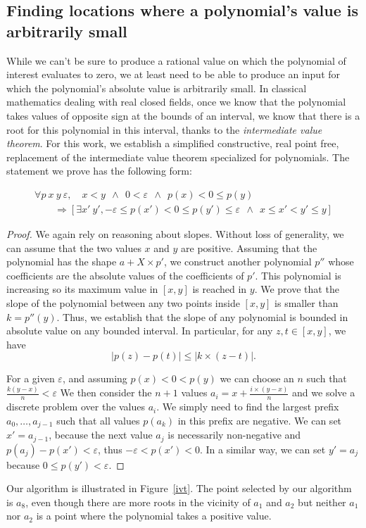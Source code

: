 \documentclass{mscs}
\begin{document}
\subsection{Finding locations where a polynomial's value is
  arbitrarily small}
\label{ssec:civt}
While we can't be sure to produce a rational value on which the
polynomial of interest evaluates to zero, we at least need to be
able to produce an input for which the polynomial's absolute value is
arbitrarily small. In classical mathematics dealing with real closed
fields, once we know that the
polynomial takes values of opposite sign at the bounds of an interval,
we know that there is a root for this polynomial in this interval,
thanks to the {\em intermediate value theorem}. For this work, we establish
a simplified constructive, real point free, replacement of the intermediate value
theorem specialized for polynomials.  The statement we prove has the following
form:
\begin{theorem}
\[
\begin{array}{l}
{\forall p~x~y~\varepsilon,\quad x < y~~\wedge~~0 < \varepsilon~~\wedge~~p(x) < 0 \leq p(y)}\\
\qquad\Rightarrow [\exists x'~ y', -\varepsilon \leq p(x') < 0 \leq p(y') \leq
\varepsilon ~~\wedge~~
x \leq x' < y' \leq y]
\end{array}
\]
\end{theorem}
\begin{proof}
We again rely on reasoning about slopes. Without loss of generality,
we can assume that the two values \(x\) and \(y\) are positive. Assuming
that the polynomial has the shape \(a + X \times p'\), we construct
another
polynomial \(p''\) whose coefficients are the absolute values of the
coefficients of \(p'\).  This polynomial is increasing so its maximum
value in \([x,y]\) is reached in \(y\).   We prove that the slope
of the polynomial between any two points inside \([x,y]\) is smaller than
\(k  = p''(y)\).  Thus, we establish that the
slope of any polynomial is bounded in absolute value on any bounded
interval.  In particular, for any \(z, t\in [x,y]\), we have
\[|p(z)-p(t)| \leq |k \times (z - t)|.\]

For a given \(\varepsilon\), and assuming \(p(x) < 0 < p(y)\) we can
choose an \(n\) such that \(\frac{k(y-x)}{n} < \varepsilon\)
 We then consider the
\(n+1\) values \(a_i = x + \frac{i\times (y-x)}{n}\) and we solve a
discrete problem over the values \(a_i\).  We simply need to find the
largest prefix \(a_0, \ldots, a_{j-1}\) such that all values \(p(a_k)\) in this
prefix are negative.  We can set \(x' =a_{j-1}\), because the next
value \(a_j\) is necessarily non-negative and
\(p(a_j) - p(x') < \varepsilon\), thus \(-\varepsilon < p(x') < 0\).
In a similar way, we can set \(y'= a_j\) because \(0 \leq p(y') < \varepsilon\).
\end{proof}
Our algorithm is illustrated in Figure~\ref{ivt}. The point selected by
our algorithm is \(a_8\), even though there are more roots in the
vicinity of \(a_1\) and \(a_2\) but neither \(a_1\) nor \(a_2\) is a
point where the polynomial takes a positive value.
\end{document}
